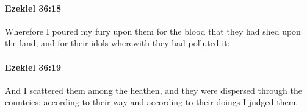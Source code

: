 		\paragraph{Ezekiel 36:18} %
			\label{EZEKIEL-36-18}

			Wherefore I poured my fury upon them for the blood that they had shed upon the land, and for their idols wherewith they had polluted it:


		\paragraph{Ezekiel 36:19} %
			\label{EZEKIEL-36-19}

			And I scattered them among the heathen, and they were dispersed through the countries: according to their way and according to their doings I judged them.


